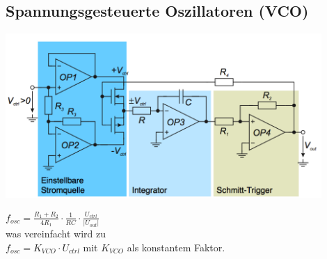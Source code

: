 	\subsection{Spannungsgesteuerte Oszillatoren (VCO)}
		\begin{minipage}{12cm}
			\includegraphics[width=12cm]{images/vco.png}
		\end{minipage}
		\begin{minipage}{6cm}
			$f_{osc} = \frac{R_1 + R_2}{4 R_1} \cdot \frac{1}{RC} \cdot \frac{U_{ctrl}}{|U_{out}|}$ \\
			
			was vereinfacht wird zu \\
			$f_{osc} = K_{VCO} \cdot U_{ctrl}$ mit $K_{VCO}$ als konstantem Faktor.
		\end{minipage}